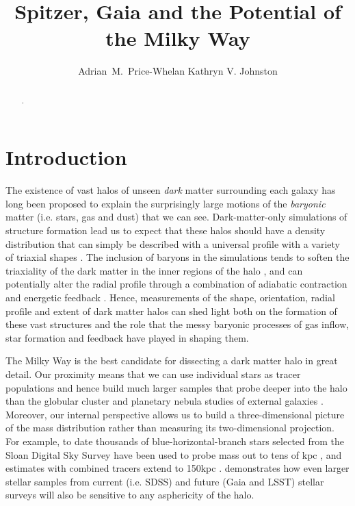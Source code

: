 \documentclass[preprint]{aastex}
\begin{document}
\title{Spitzer, Gaia and the Potential of the Milky Way}

\author{Adrian~M.~Price-Whelan Kathryn V. Johnston}


\begin{abstract}
.
\end{abstract}


\section{Introduction}
\label{intro.sec}
 The existence of vast halos of unseen {\it dark} matter surrounding each galaxy has long been proposed \citep[e.g.,][]{zwicky37,rubin70} to explain the surprisingly large
motions of the {\it baryonic} matter (i.e. stars, gas and dust) that we can see.
Dark-matter-only simulations of structure formation lead us to expect that these  halos should have a density distribution that can simply be described with a universal
profile \citep{navarro96} with a variety of triaxial shapes \citep{jing02}.
The inclusion of baryons in the simulations tends to soften the triaxiality of the dark matter in the inner regions of the halo \citep[as the disk forms, see e.g.,][]{bailin05}, and
can potentially alter the radial profile through a combination of adiabatic contraction and energetic feedback \citep[see recent discussion by][]{pontzen12}.
Hence, measurements of the shape, orientation, radial profile and extent of dark matter halos can shed light both on the formation of these vast structures and the role that
the messy baryonic processes of gas inflow, star formation and feedback  have played in shaping them.

The Milky Way is the best candidate  for dissecting a dark matter halo in great detail.
Our proximity means that we can use individual stars as tracer populations and hence build much larger samples that probe deeper into the halo than the globular cluster
and planetary nebula studies of external galaxies \citep[e.g.][]{mendez01,cote03}.
Moreover, our internal perspective allows us to build a three-dimensional picture of the mass distribution rather than measuring its two-dimensional projection.
For example, to date thousands of blue-horizontal-branch stars selected from the Sloan Digital Sky Survey  have been used to probe mass out to tens of
kpc \citep[SDSS, see][]{deason12a,kafle12}, and estimates with combined tracers extend to 150kpc \citep{deason12b}.
\citet{loebman12} demonstrates how even larger stellar samples from current (i.e. SDSS) and future  (Gaia and LSST) stellar surveys will also be sensitive to any
asphericity of the halo.
\end{document}
